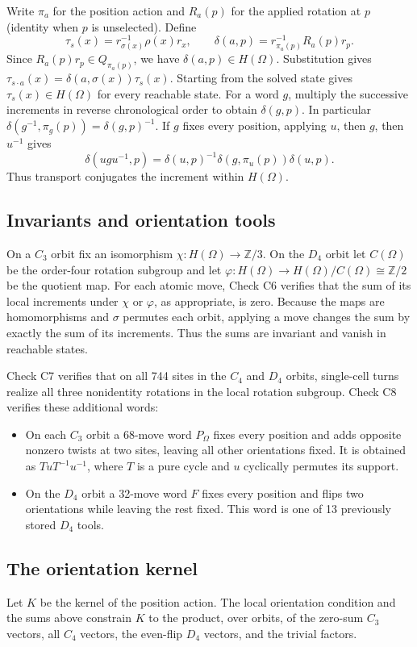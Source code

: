 \documentclass[a4paper,11pt]{article}
\theoremstyle{definition}
\begin{document}
Write $\pi_a$ for the position action and $R_a(p)$ for the applied
rotation at $p$ (identity when $p$ is unselected). Define
\[
\tau_s(x)=r_{\sigma(x)}^{-1}\rho(x)r_x,\qquad
\delta(a,p)=r_{\pi_a(p)}^{-1}R_a(p)r_p .
\]
Since $R_a(p)r_p\in Q_{\pi_a(p)}$, we have $\delta(a,p)\in H(\Omega)$.
Substitution gives $\tau_{s\cdot a}(x)=\delta(a,\sigma(x))\tau_s(x)$.
Starting from the solved state gives $\tau_s(x)\in H(\Omega)$ for
every reachable state. For a word $g$, multiply the successive
increments in reverse chronological order to obtain $\delta(g,p)$.
In particular $\delta(g^{-1},\pi_g(p))=\delta(g,p)^{-1}$.
If $g$ fixes every position, applying $u$, then $g$, then $u^{-1}$ gives
\[
\delta(ugu^{-1},p)=
\delta(u,p)^{-1}\delta(g,\pi_u(p))\delta(u,p).
\]
Thus transport conjugates the increment within $H(\Omega)$.

\subsection{Invariants and orientation tools}
On a $C_3$ orbit fix an isomorphism $\chi:H(\Omega)\to\mathbb Z/3$.
On the $D_4$ orbit let $C(\Omega)$ be the order-four rotation subgroup
and let $\varphi:H(\Omega)\to H(\Omega)/C(\Omega)\cong\mathbb Z/2$ be
the quotient map. For each atomic move, Check C6 verifies that the
sum of its local increments under $\chi$ or $\varphi$, as appropriate,
is zero. Because the maps are homomorphisms and $\sigma$ permutes
each orbit, applying a move changes the sum by exactly the sum of
its increments. Thus the sums are invariant and vanish in reachable states.

Check C7 verifies that on all 744 sites in the $C_4$ and $D_4$ orbits,
single-cell turns realize all three nonidentity rotations in the
local rotation subgroup. Check C8 verifies these additional words:
\begin{itemize}
\item On each $C_3$ orbit a 68-move word $P_\Omega$ fixes every position
and adds opposite nonzero twists at two sites, leaving all other
orientations fixed. It is obtained as $T u T^{-1}u^{-1}$, where $T$
is a pure cycle and $u$ cyclically permutes its support.
\item On the $D_4$ orbit a 32-move word $F$ fixes every position and
flips two orientations while leaving the rest fixed. This word is
one of 13 previously stored $D_4$ tools.
\end{itemize}

\subsection{The orientation kernel}
Let $K$ be the kernel of the position action. The local orientation
condition and the sums above constrain $K$ to the product, over orbits,
of the zero-sum $C_3$ vectors, all $C_4$ vectors, the even-flip $D_4$
vectors, and the trivial factors.
\end{document}
